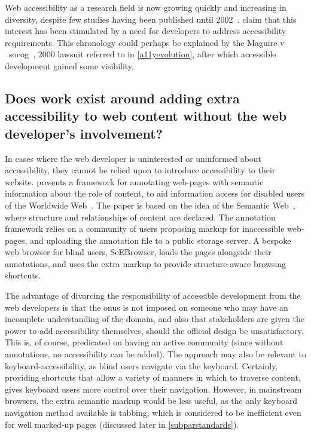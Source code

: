 \documentclass[11pt,openright,a4paper]{report}
\begin{document}
Web accessibility as a research field is now growing quickly and increasing in diversity, despite few studies having been published until 2002~\cite{freire2007techniques}. \citeauthor{freire2007techniques} claim that this interest has been stimulated by a need for developers to address accessibility requirements. This chronology could perhaps be explained by the Maguire v ~\gls{socog}~\cite{sloan2001web,russell2003access}, 2000 lawsuit referred to in \cref{a11yevolution}, after which accessible development gained some visibility.
\subsection{Does work exist around adding extra accessibility to web content without the web developer's involvement?}
\label{addingaccessibilityyourself}
In cases where the web developer is uninterested or uninformed about accessibility, they cannot be relied upon to introduce accessibility to their website. \citeauthor{kouroupetroglou2006semantic} presents a framework for annotating web-pages with semantic information about the role of content, to aid information access for disabled users of the Worldwide Web~\cite{kouroupetroglou2006semantic}. The paper is based on the idea of the Semantic Web~\cite{berners2001semantic}, where structure and relationships of content are declared. The annotation framework relies on a community of users proposing markup for inaccessible web-pages, and uploading the annotation file to a public storage server. A bespoke web browser for blind users, SeEBrowser, loads the pages alongside their annotations, and uses the extra markup to provide structure-aware browsing shortcuts.

The advantage of divorcing the responsibility of accessible development from the web developers is that the onus is not imposed on someone who may have an incomplete understanding of the domain, and also that stakeholders are given the power to add accessibility themselves, should the official design be unsatisfactory. This is, of course, predicated on having an active community (since without annotations, no accessibility can be added). The approach may also be relevant to keyboard-accessibility, as blind users navigate via the keyboard. Certainly, providing shortcuts that allow a variety of manners in which to traverse content, gives keyboard users more control over their navigation. However, in mainstream browsers, the extra semantic markup would be less useful, as the only keyboard navigation method available is tabbing, which is considered to be inefficient even for well marked-up pages (discussed later in \cref{subparstandards}).
\end{document}
